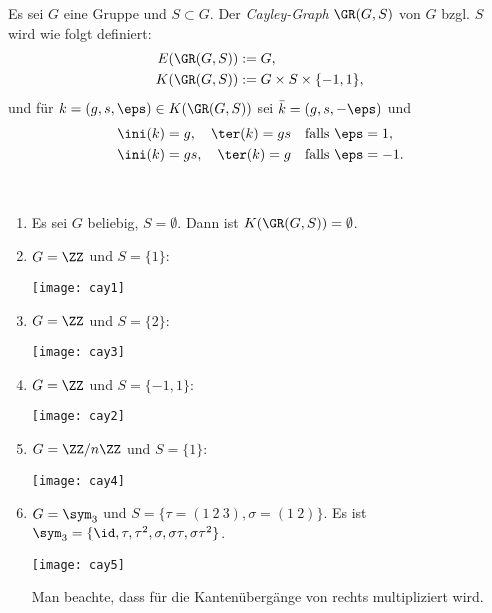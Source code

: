 \DB Es sei $G$ eine Gruppe und $S\subset G$.
Der \emph{Cayley-Graph}
$\GR(G,S)$ von $G$ bzgl. $S$ wird wie folgt definiert:
\begin{align*}
E(\GR(G,S)) &:= G, \\
K(\GR(G,S)) &:= G \times S \times \{-1,1\},
\end{align*}
und für $k=(g,s,\eps)\in K(\GR(G,S))$ sei $\bar{k}=(g,s,-\eps)$
und
\begin{align*}
&\ini(k) = g, \quad \ter(k) = gs \quad \text{falls } \eps = 1, \\
&\ini(k) = gs, \quad \ter(k) = g \quad \text{falls } \eps = -1.
\end{align*}

\BSP\label{bsp_cay}\
\begin{enumerate}
\item Es sei $G$ beliebig, $S=\emptyset$.
Dann ist $K(\GR(G,S))=\emptyset$.
\item $G=\ZZ$ und $S=\{1\}$:
\begin{center}
	\texttt{[image: cay1]}
\end{center}
\item $G=\ZZ$ und $S=\{2\}$:
\begin{center}
	\texttt{[image: cay3]}
\end{center}
\item $G=\ZZ$ und $S=\{-1,1\}$:
\begin{center}
	\texttt{[image: cay2]}
\end{center}
\item $G=\ZZ/n\ZZ$ und $S=\{1\}$:
\begin{center}
	\texttt{[image: cay4]}
\end{center}
\item $G=\sym_3$ und $S=\{\tau=(1\ 2\ 3),\sigma=(1\ 2)\}$.
Es ist $\sym_3=\{\id,\tau,\tau^2,\sigma,\sigma\tau,\sigma\tau^2\}$.
\begin{center}
	\texttt{[image: cay5]}
\end{center}
Man beachte, dass für die Kantenübergänge von rechts multipliziert 
wird.
\end{enumerate}

